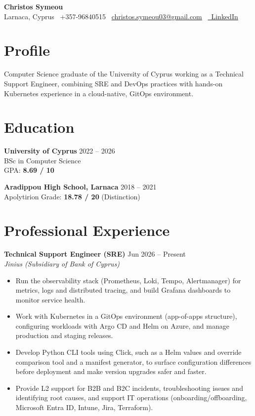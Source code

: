 \documentclass[11pt]{article}
\begin{document}
\begin{center}
    {\LARGE \textbf{Christos Symeou}}\\[0.18cm]
    Larnaca, Cyprus \textbullet\ +357-96840515 \textbullet\
    \href{mailto:christos.symeou03@gmail.com}{christos.symeou03@gmail.com} \textbullet\
    \href{https://www.linkedin.com/in/christos-symeou-160436305}{\faLinkedin\ LinkedIn}
\end{center}

\section*{Profile}
Computer Science graduate of the University of Cyprus working as a Technical Support Engineer, combining SRE and DevOps practices with hands-on Kubernetes experience in a cloud-native, GitOps environment.

\section*{Education}
\textbf{University of Cyprus} \hfill 2022 -- 2026\\
BSc in Computer Science\\
GPA: \textbf{8.69 / 10}

\textbf{Aradippou High School, Larnaca} \hfill 2018 -- 2021\\
Apolytirion Grade: \textbf{18.78 / 20} (Distinction)

\section*{Professional Experience}
\textbf{Technical Support Engineer (SRE)} \hfill Jun 2026 -- Present\\
\textit{Jinius (Subsidiary of Bank of Cyprus)} \hfill 
\begin{itemize}
\item Run the observability stack (Prometheus, Loki, Tempo, Alertmanager) for metrics, logs and distributed tracing, and build Grafana dashboards to monitor service health.
\item Work with Kubernetes in a GitOps environment (app-of-apps structure), configuring workloads with Argo CD and Helm on Azure, and manage production and staging releases.
\item Develop Python CLI tools using Click, such as a Helm values and override comparison tool and a manifest generator, to surface configuration differences before deployment and make version upgrades safer and faster.
\item Provide L2 support for B2B and B2C incidents, troubleshooting issues and identifying root causes, and support IT operations (onboarding/offboarding, Microsoft Entra ID, Intune, Jira, Terraform).
\end{itemize}
\end{document}
